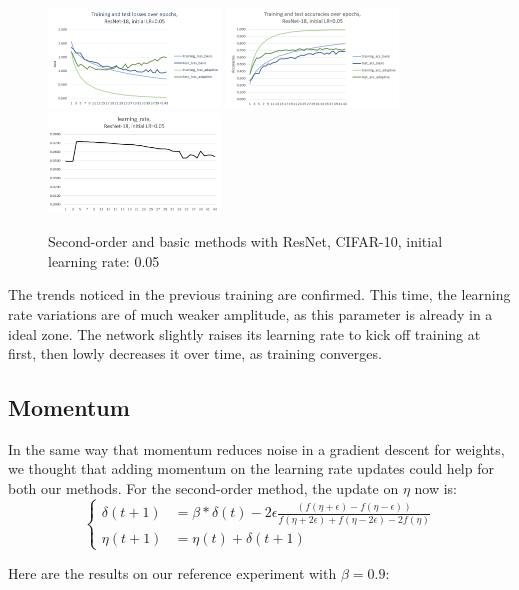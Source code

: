 \documentclass{article}
\begin{document}
  \begin{figure}[!h]
	\includegraphics[width=130pt]{loss_resnet_0_05.png}
	\includegraphics[width=130pt]{acc_resnet_0_05.png}
	\includegraphics[width=130pt]{lr_resnet_0_05.png}
	\caption{Second-order and basic methods with ResNet, CIFAR-10, initial learning rate: 0.05}
  \end{figure}
  
  The trends noticed in the previous training are confirmed. This time, the learning rate variations are of much weaker amplitude, as this parameter is already in a ideal zone. The network slightly raises its learning rate to kick off training at first, then lowly decreases it over time, as training converges. 
  
  \subsection{Momentum}
  
  In the same way that momentum reduces noise in a gradient descent for weights, we thought that adding momentum on the learning rate updates could help for both our methods. For the second-order method, the update on $\eta$ now is:\\
  $$
  \left\{
  \begin{array}{lll}
  \delta(t+1) &= \beta*\delta(t) - 2\epsilon\frac{(f(\eta+\epsilon)-f(\eta-\epsilon))}{f(\eta+2\epsilon)+f(\eta-2\epsilon)-2f(\eta)}\\
  \eta(t+1) &= \eta(t) + \delta(t+1)
  \end{array}
  \right.
  $$
  
  Here are the results on our reference experiment with $\beta=0.9$:\\
  
\end{document}
